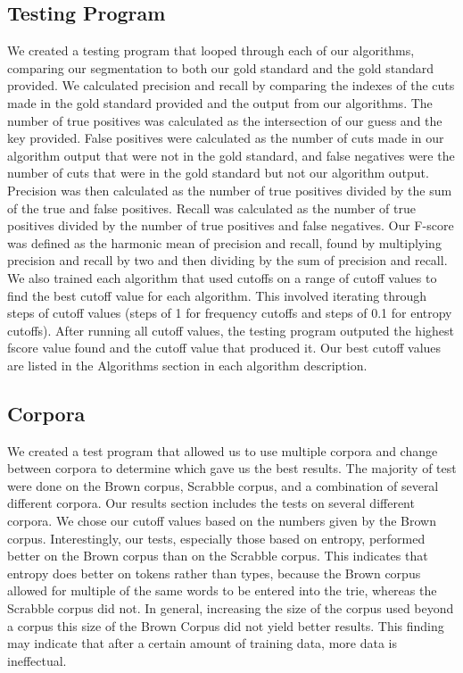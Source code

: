 \documentclass[11pt,letterpaper]{article}
\begin{document}
\subsection{Testing Program}  
  We created a testing program that looped through each of our algorithms, comparing our segmentation to both our gold standard and the gold standard provided. 
  We calculated precision and recall by comparing the indexes of the cuts made in the gold standard provided and the output from our algorithms. The number of true positives was calculated as the intersection of our guess and the key provided. False positives were calculated as the number of cuts made in our algorithm output that were not in the gold standard, and false negatives were the number of cuts that were in the gold standard but not our algorithm output. 
  Precision was then calculated as the number of true positives divided by the sum of the true and false positives. Recall was calculated as the number of true positives divided by the number of true positives and false negatives. Our F-score was defined as the harmonic mean of precision and recall, found by multiplying precision and recall by two and then dividing by the sum of precision and recall.
  We also trained each algorithm that used cutoffs on a range of cutoff values to find the best cutoff value for each algorithm. This involved iterating through steps of cutoff values (steps of 1 for frequency cutoffs and steps of 0.1 for entropy cutoffs).
 After running all cutoff values, the testing program outputed the highest fscore value found and the cutoff value that produced it. Our best cutoff values are listed in the Algorithms section in each algorithm description. 
    

\subsection{Corpora} 

  We created a test program that allowed us to use multiple corpora and change between corpora to determine which gave us the best results. The majority of test were done on the Brown corpus, Scrabble corpus, and a combination of several different corpora. 
  Our results section includes the tests on several different corpora. We chose our cutoff values based on the numbers given by the Brown corpus. 
    Interestingly, our tests, especially those based on entropy, performed better on the Brown corpus than on the Scrabble corpus. This indicates that entropy does better on tokens rather than types, because the Brown corpus allowed for multiple of the same words to be entered into the trie, whereas the Scrabble corpus did not. In general, increasing the size of the corpus used beyond a corpus this size of the Brown Corpus did not yield better results. This finding may indicate that after a certain amount of training data, more data is ineffectual. 
    
\end{document}
